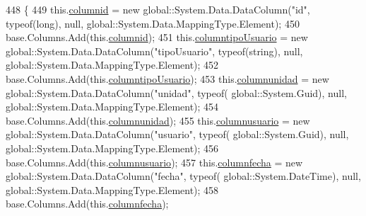 \begin{DoxyCode}
448                                      \{
449                 this.\hyperlink{class_proyecto___integrador__3_1_1ds_servicios_1_1_servicios_data_table_a42ed0070aba427354954b37e5955b03b}{columnid} = \textcolor{keyword}{new} global::System.Data.DataColumn(\textcolor{stringliteral}{"id"}, typeof(\textcolor{keywordtype}{long}), null, 
      global::System.Data.MappingType.Element);
450                 base.Columns.Add(this.\hyperlink{class_proyecto___integrador__3_1_1ds_servicios_1_1_servicios_data_table_a42ed0070aba427354954b37e5955b03b}{columnid});
451                 this.\hyperlink{class_proyecto___integrador__3_1_1ds_servicios_1_1_servicios_data_table_ae6e9f606645938b441b38d9c7889971f}{columntipoUsuario} = \textcolor{keyword}{new} global::System.Data.DataColumn(\textcolor{stringliteral}{"tipoUsuario"},
       typeof(\textcolor{keywordtype}{string}), null, global::System.Data.MappingType.Element);
452                 base.Columns.Add(this.\hyperlink{class_proyecto___integrador__3_1_1ds_servicios_1_1_servicios_data_table_ae6e9f606645938b441b38d9c7889971f}{columntipoUsuario});
453                 this.\hyperlink{class_proyecto___integrador__3_1_1ds_servicios_1_1_servicios_data_table_a3b6ef8814cd3226485969d0a1e3900d3}{columnunidad} = \textcolor{keyword}{new} global::System.Data.DataColumn(\textcolor{stringliteral}{"unidad"}, typeof(
      global::System.Guid), null, global::System.Data.MappingType.Element);
454                 base.Columns.Add(this.\hyperlink{class_proyecto___integrador__3_1_1ds_servicios_1_1_servicios_data_table_a3b6ef8814cd3226485969d0a1e3900d3}{columnunidad});
455                 this.\hyperlink{class_proyecto___integrador__3_1_1ds_servicios_1_1_servicios_data_table_a528b90d784325ac1cebec3c973dcd0e4}{columnusuario} = \textcolor{keyword}{new} global::System.Data.DataColumn(\textcolor{stringliteral}{"usuario"}, typeof(
      global::System.Guid), null, global::System.Data.MappingType.Element);
456                 base.Columns.Add(this.\hyperlink{class_proyecto___integrador__3_1_1ds_servicios_1_1_servicios_data_table_a528b90d784325ac1cebec3c973dcd0e4}{columnusuario});
457                 this.\hyperlink{class_proyecto___integrador__3_1_1ds_servicios_1_1_servicios_data_table_a959f072e2c0689f46c30f9bc31b2cf16}{columnfecha} = \textcolor{keyword}{new} global::System.Data.DataColumn(\textcolor{stringliteral}{"fecha"}, typeof(
      global::System.DateTime), null, global::System.Data.MappingType.Element);
458                 base.Columns.Add(this.\hyperlink{class_proyecto___integrador__3_1_1ds_servicios_1_1_servicios_data_table_a959f072e2c0689f46c30f9bc31b2cf16}{columnfecha});

\end{DoxyCode}
